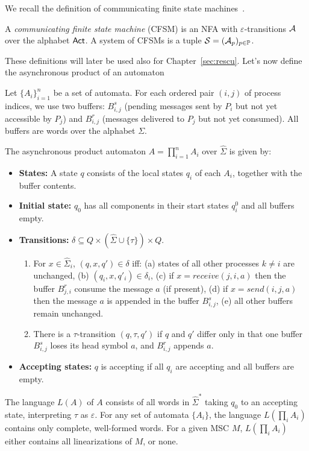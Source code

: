 We recall the definition of communicating finite state machines~\cite{BrandZafiropulo}.

\begin{definition}[CFSM] \label{def:cfsm}
    A \emph{communicating finite state machine} (CFSM) is an NFA with 
    $\varepsilon$-transitions $\mathcal{A}$ over the alphabet $\mathsf{Act}$.  
    A system of CFSMs is a tuple $\mathcal{S} = (\mathcal{A}_p)_{p \in \mathbb{P}}$.
\end{definition}

These definitions will later be used also for Chapter~\ref{sec:rescu}.
Let's now define the asynchronous product of an automaton

\begin{definition}
Let $\{A_i\}_{i=1}^n$ be a set of automata. For each ordered pair 
$(i,j)$ of process indices, we use two buffers: $B^s_{i,j}$ 
(pending messages sent by $P_i$ but not yet accessible by $P_j$) 
and $B^r_{i,j}$ (messages delivered to $P_j$ but not yet consumed). 
All buffers are words over the alphabet $\Sigma$.

The asynchronous product automaton 
$A = \prod_{i=1}^n A_i$ over $\hat{\Sigma}$ is given by: %

\begin{itemize}
  \item \textbf{States:} A state $q$ consists of the local states 
  $q_i$ of each $A_i$, together with the buffer contents.
  \item \textbf{Initial state:} $q_0$ has all components in their 
  start states $q_i^0$ and all buffers empty.
  \item \textbf{Transitions:} $\delta \subseteq Q \times 
  (\hat{\Sigma} \cup \{\tau\}) \times Q$.
    \begin{enumerate}
      \item For $x \in \hat{\Sigma}_i$, $(q,x,q') \in \delta$ iff:  
      (a) states of all other processes $k \neq i$ are unchanged,  
      (b) $(q_i,x,q'_i) \in \delta_i$,  
      (c) if $x = receive(j,i,a)$ then the buffer $B^r_{j,i}$ consume the message $a$ (if present),  
      (d) if $x = send(i,j,a)$ then the message $a$ is appended in the buffer $B^s_{i,j}$,  
      (e) all other buffers remain unchanged.
      \item There is a $\tau$-transition $(q,\tau,q')$ if $q$ and 
      $q'$ differ only in that one buffer $B^s_{i,j}$ loses its 
      head symbol $a$, and $B^r_{i,j}$ appends $a$.
    \end{enumerate}
  \item \textbf{Accepting states:} $q$ is accepting if all $q_i$ 
  are accepting and all buffers are empty.
\end{itemize}

The language $L(A)$ of $A$ consists of all words in $\hat{\Sigma}^*$ 
taking $q_0$ to an accepting state, interpreting $\tau$ as 
$\varepsilon$. For any set of automata $\{A_i\}$, the language 
$L(\prod_i A_i)$ contains only complete, well-formed words. For a 
given MSC $M$, $L(\prod_i A_i)$ either contains all linearizations 
of $M$, or none.
\end{definition}

